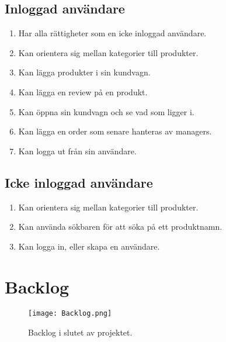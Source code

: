 \documentclass[a4paper]{article}
\begin{document}
\subsection{Inloggad användare}
\begin{enumerate}
  \item Har alla rättigheter som en icke inloggad användare.
  \item Kan orientera sig mellan kategorier till produkter.
  \item Kan lägga produkter i sin kundvagn.
  \item Kan lägga en review på en produkt.
  \item Kan öppna sin kundvagn och se vad som ligger i.
  \item Kan lägga en order som senare hanteras av managers.
  \item Kan logga ut från sin användare.
\end{enumerate}
%
\subsection{Icke inloggad användare}
\begin{enumerate}
  \item Kan orientera sig mellan kategorier till produkter.
  \item Kan använda sökbaren för att söka på ett produktnamn.
  \item Kan logga in, eller skapa en användare.
\end{enumerate}
%
\section{Backlog}
%
\begin{figure}[h]
\caption{Backlog i slutet av projektet.}
\centering
\texttt{[image: Backlog.png]}
\end{figure}
%
\end{document}
